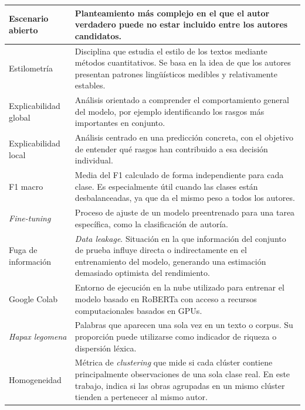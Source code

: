 \documentclass[IB]{TFUOC}%
\begin{document}
\begin{longtable}{|p{5.2cm}|p{10.5cm}|}
Escenario abierto &
Planteamiento más complejo en el que el autor verdadero puede no estar incluido entre los autores candidatos. \\
\hline

Estilometría &
Disciplina que estudia el estilo de los textos mediante métodos cuantitativos. Se basa en la idea de que los autores presentan patrones lingüísticos medibles y relativamente estables. \\
\hline

Explicabilidad global &
Análisis orientado a comprender el comportamiento general del modelo, por ejemplo identificando los rasgos más importantes en conjunto. \\
\hline

Explicabilidad local &
Análisis centrado en una predicción concreta, con el objetivo de entender qué rasgos han contribuido a esa decisión individual. \\
\hline

F1 macro &
Media del F1 calculado de forma independiente para cada clase. Es especialmente útil cuando las clases están desbalanceadas, ya que da el mismo peso a todos los autores. \\
\hline

\textit{Fine-tuning} &
Proceso de ajuste de un modelo preentrenado para una tarea específica, como la clasificación de autoría. \\
\hline

Fuga de información &
\textit{Data leakage}. Situación en la que información del conjunto de prueba influye directa o indirectamente en el entrenamiento del modelo, generando una estimación demasiado optimista del rendimiento. \\
\hline

Google Colab &
Entorno de ejecución en la nube utilizado para entrenar el modelo basado en RoBERTa con acceso a recursos computacionales basados en GPUs. \\
\hline

\textit{Hapax legomena} &
Palabras que aparecen una sola vez en un texto o corpus. Su proporción puede utilizarse como indicador de riqueza o dispersión léxica. \\
\hline

Homogeneidad &
Métrica de \textit{clustering} que mide si cada clúster contiene principalmente observaciones de una sola clase real. En este trabajo, indica si las obras agrupadas en un mismo clúster tienden a pertenecer al mismo autor. \\
\hline


\end{longtable}
\end{document}
